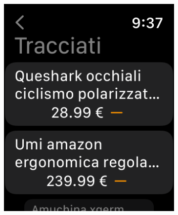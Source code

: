 \begin{figure}[h!]
        \centering
        \begin{subfigure}[b]{0.3\textwidth}
            \centering
            \includegraphics[width=\textwidth]{images/interfaces/watch_list_1.png}
        \end{subfigure}
        \begin{subfigure}[b]{0.3\textwidth}
            \centering

\end{subfigure}
\end{figure}
